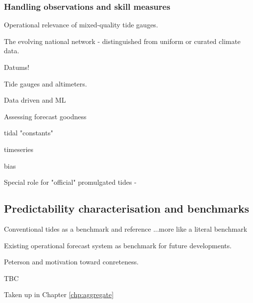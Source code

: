 \subsubsection{Handling observations and skill measures}
Operational relevance of mixed-quality tide gauges.

The evolving national network - distinguished from uniform or curated climate data.


Datums!

Tide gauges and altimeters.    


Data driven and ML


Assessing forecast goodness

tidal "constants"

timeseries

bias

Special role for "official" promulgated tides -

\subsection{Predictability characterisation and benchmarks}

Conventional tides as a benchmark and reference ...more like a literal benchmark


Existing operational forecast system as benchmark for future developments.


Peterson and motivation toward conreteness.


TBC

Taken up in Chapter \ref{chp:aggregate}





